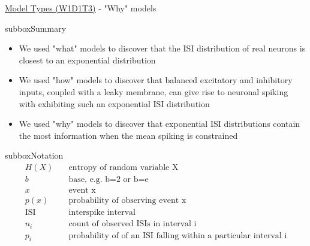 \begin{textbox}{\href{https://compneuro.neuromatch.io/tutorials/W1D1_ModelTypes/student/W1D1_Tutorial3.html}{Model Types (W1D1T3)} -  "Why" models}
\begin{subbox}{subbox}{Summary}
\begin{itemize}
\item We used "what" models to discover that the ISI distribution of real neurons is closest to an exponential distribution
\item We used "how" models to discover that balanced excitatory and inhibitory inputs, coupled with a leaky membrane, can give rise to neuronal spiking with exhibiting such an exponential ISI distribution
 \item We used "why" models to discover that exponential ISI distributions contain the most information when the mean spiking is constrained
\end{itemize}
\end{subbox}

\begin{subbox}{subbox}{Notation}
\tiny
\begin{align*}
H(X) &\quad \text{entropy of random variable X}\\
b &\quad \text{base, e.g. b=2 or b=e}\\
x &\quad \text{event x}\\
p(x) &\quad \text{probability of observing event x}\\
\text{ISI} &\quad \text{interspike interval}\\
n_i &\quad \text{count of observed ISIs in interval i}\\
p_i  &\quad \text{probability of of an ISI falling within a particular interval i}
\end{align*}
\end{subbox}
\end{textbox}

